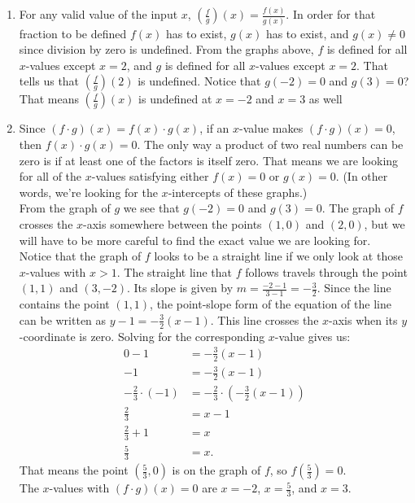 \documentclass{ximera}
\begin{document}
\begin{example}
\begin{explanation}
\begin{enumerate}
				\item For any valid value of the input $x$,  $\left(\frac{f}{g}\right)(x) = \frac{f(x)}{g(x)}$. In order for that fraction to be defined
					$f(x)$ has to exist, $g(x)$ has to exist, and $g(x) \neq 0$ since division by zero is undefined. 
					From the graphs above, $f$ is defined for all $x$-values except $x=2$, and $g$ is defined for all $x$-values except $x=2$. That
					tells us that $\left( \frac{f}{g} \right)(2)$ is undefined. Notice that $g(-2)=0$ and $g(3)=0$? That means 
					$\left( \frac{f}{g}\right)(x)$ is undefined at $x=-2$ and $x=3$ as well
					
				\item Since $( f \cdot g)(x) = f(x) \cdot g(x)$, if an $x$-value makes $(f \cdot g)(x)=0$, then $f(x)\cdot g(x)= 0$. The only
					way a product of two real numbers can be zero is if at least one of the factors is itself zero. That means we are looking
					for all of the $x$-values satisfying either $f(x)=0$ or $g(x)=0$. (In other words, we're looking for the $x$-intercepts of 
					these graphs.)\\
					
					From the graph of $g$ we see that $g(-2)=0$ and $g(3)=0$. The graph of $f$ crosses the $x$-axis somewhere between the
					points $(1,0)$ and $(2,0)$, but we will have to be more careful to find the exact value we are looking for. \\
					
					Notice that the graph of $f$ looks to be a straight line if we only look at those $x$-values with $x>1$. The straight line that
					$f$ follows travels through the point $(1,1)$ and $(3, -2)$. Its slope is given by $m = \frac{-2 - 1}{3 - 1} = -\frac{3}{2}$. Since
					the line contains the point $(1,1)$, the point-slope form of the equation of the line can be written as $y-1 = -\frac{3}{2}(x-1)$.
					This line crosses the $x$-axis when its $y$-coordinate is zero. Solving for the corresponding $x$-value gives us:
					\begin{align*}
						0 - 1 &= -\frac{3}{2}(x-1)\\
						-1 &= -\frac{3}{2}(x-1)\\
						-\frac{2}{3} \cdot (-1) &= -\frac{2}{3} \cdot \left( -\frac{3}{2}(x-1) \right)\\
						\frac{2}{3} &= x-1\\
						\frac{2}{3} + 1 &= x\\
						\frac{5}{3} &= x.
					\end{align*}
					That means the point $\left( \frac{5}{3}, 0 \right)$ is on the graph of $f$, so $f\left( \frac{5}{3} \right) = 0$.\\
					
					The $x$-values with $(f \cdot g)(x) = 0$ are $x=-2$, $x=\frac{5}{3}$, and $x=3$.
			\end{enumerate}
		\end{explanation}	
	\end{example}
\end{document}
